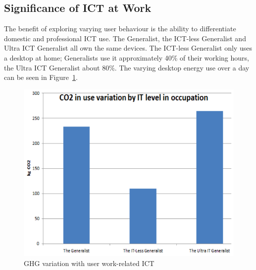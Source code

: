 \documentclass[conference]{IEEEtran}
\begin{document}


\subsection{Significance of ICT at Work}

The benefit of exploring varying user behaviour is the ability to
differentiate domestic and professional ICT use. The Generalist, the
ICT-less Generalist and Ultra ICT Generalist all own the same
devices. The ICT-less Generalist only uses a desktop at home;
Generalists use it approximately 40\% of their working hours, the
Ultra ICT Generalist about 80\%. The varying desktop energy use
over a day can be seen in
Figure~\ref{fig:ghgvariation_userworkrelatedit}.

\begin{figure}[!ht]
\centering
\includegraphics[width=0.9\columnwidth]{images/ghgvariation_userworkrelatedit.png}
\caption{GHG variation with user work-related ICT}
\label{fig:ghgvariation_userworkrelatedit} 
\end{figure}
\end{document}
